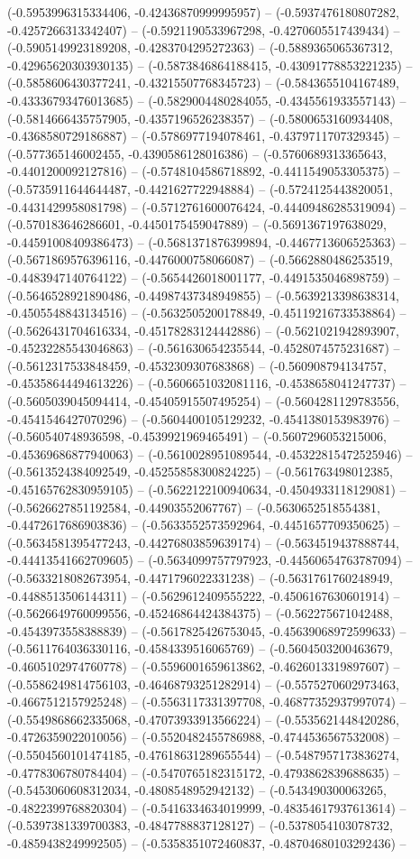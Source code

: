 (-0.5953996315334406, -0.42436870999995957) -- (-0.5937476180807282, -0.4257266313342407) -- (-0.5921190533967298, -0.4270605517439434) -- (-0.5905149923189208, -0.4283704295272363) -- (-0.5889365065367312, -0.42965620303930135) -- (-0.5873846864188415, -0.43091778853221235) -- (-0.5858606430377241, -0.43215507768345723) -- (-0.5843655104167489, -0.43336793476013685) -- (-0.5829004480284055, -0.4345561933557143) -- (-0.5814666435757905, -0.4357196526238357) -- (-0.5800653160934408, -0.4368580729186887) -- (-0.5786977194078461, -0.4379711707329345) -- (-0.577365146002455, -0.4390586128016386) -- (-0.5760689313365643, -0.4401200092127816) -- (-0.5748104586718892, -0.4411549053305375) -- (-0.5735911644644487, -0.4421627722948884) -- (-0.5724125443820051, -0.4431429958081798) -- (-0.5712761600076424, -0.44409486285319094) -- (-0.570183646286601, -0.4450175459047889) -- (-0.5691367197638029, -0.44591008409386473) -- (-0.5681371876399894, -0.4467713606525363) -- (-0.5671869576396116, -0.4476000758066087) -- (-0.5662880486253519, -0.4483947140764122) -- (-0.5654426018001177, -0.4491535046898759) -- (-0.5646528921890486, -0.44987437348949855) -- (-0.5639213398638314, -0.4505548843134516) -- (-0.5632505200178849, -0.45119216733538864) -- (-0.5626431704616334, -0.45178283124442886) -- (-0.5621021942893907, -0.45232285543046863) -- (-0.561630654235544, -0.4528074575231687) -- (-0.5612317533848459, -0.4532309307683868) -- (-0.560908794134757, -0.45358644494613226) -- (-0.5606651032081116, -0.4538658041247737) -- (-0.5605039045094414, -0.45405915507495254) -- (-0.5604281129783556, -0.4541546427070296) -- (-0.5604400105129232, -0.4541380153983976) -- (-0.560540748936598, -0.4539921969465491) -- (-0.5607296053215006, -0.45369686877940063) -- (-0.5610028951089544, -0.45322815472525946) -- (-0.5613524384092549, -0.45255858300824225) -- (-0.561763498012385, -0.45165762830959105) -- (-0.5622122100940634, -0.4504933118129081) -- (-0.5626627851192584, -0.44903552067767) -- (-0.5630652518554381, -0.4472617686903836) -- (-0.5633552573592964, -0.4451657709350625) -- (-0.5634581395477243, -0.44276803859639174) -- (-0.5634519437888744, -0.44413541662709605) -- (-0.5634099757797923, -0.44560654763787094) -- (-0.5633218082673954, -0.4471796022331238) -- (-0.5631761760248949, -0.4488513506144311) -- (-0.5629612409555222, -0.4506167630601914) -- (-0.5626649760099556, -0.45246864424384375) -- (-0.562275671042488, -0.4543973558388839) -- (-0.5617825426753045, -0.45639068972599633) -- (-0.5611764036330116, -0.4584339516065769) -- (-0.5604503200463679, -0.4605102974760778) -- (-0.5596001659613862, -0.4626013319897607) -- (-0.5586249814756103, -0.46468793251282914) -- (-0.5575270602973463, -0.4667512157925248) -- (-0.5563117331397708, -0.46877352937997074) -- (-0.5549868662335068, -0.47073933913566224) -- (-0.5535621448420286, -0.4726359022010056) -- (-0.5520482455786988, -0.4744536567532008) -- (-0.5504560101474185, -0.47618631289655544) -- (-0.5487957173836274, -0.4778306780784404) -- (-0.5470765182315172, -0.4793862839688635) -- (-0.5453060608312034, -0.4808548952942132) -- (-0.543490300063265, -0.4822399768820304) -- (-0.5416334634019999, -0.48354617937613614) -- (-0.5397381339700383, -0.4847788837128127) -- (-0.5378054103078732, -0.4859438249992505) -- (-0.5358351072460837, -0.48704680103292436) -- 